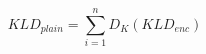 \begin{equation}
        KLD_{plain} = \sum_{i=1}^{n} D_K(KLD_{enc})
    \label{eq:fhe_kld_decrypt}
\end{equation}